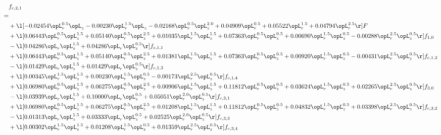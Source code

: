 \begin{alignat}{2} 
\label{eq:f_21_1} 
& f_{c,2,1} \nonumber \\ 
 = \\ 
& + \l[  -0.02454 \opL_r^{0.5} \opL_z   -0.00230 \opL_r^{1.5} \opL_z   -0.02168 \opL_r^{0.5} \opL_z^{2.0} +  0.04909 \opL_r^{0.5} +  0.05522 \opL_r^{1.5} +  0.04794 \opL_r^{2.5}  \r] F \nonumber \\ 
& + \l[  0.06443 \opL_r^{0.5} \opL_z^{1.5} +  0.05140 \opL_r^{0.5} \opL_z^{2.5} +  0.01035 \opL_r^{1.5} \opL_z^{1.5} +  0.07363 \opL_r^{0.5} \opL_z^{0.5} +  0.00690 \opL_r^{1.5} \opL_z^{0.5}   -0.00288 \opL_r^{2.5} \opL_z^{0.5}  \r] f_{1,0} \nonumber \\ 
& - \l[  0.04286 \opL_r \opL_z^{1.5} +  0.04286 \opL_r \opL_z^{0.5}  \r] f_{c,1,1} \nonumber \\ 
& + \l[  0.06443 \opL_r^{0.5} \opL_z^{1.5} +  0.05140 \opL_r^{0.5} \opL_z^{2.5} +  0.01381 \opL_r^{1.5} \opL_z^{1.5} +  0.07363 \opL_r^{0.5} \opL_z^{0.5} +  0.00920 \opL_r^{1.5} \opL_z^{0.5}   -0.00431 \opL_r^{2.5} \opL_z^{0.5}  \r] f_{c,1,2} \nonumber \\ 
& - \l[  0.01429 \opL_r \opL_z^{1.5} +  0.01429 \opL_r \opL_z^{0.5}  \r] f_{c,1,3} \nonumber \\ 
& + \l[  0.00345 \opL_r^{1.5} \opL_z^{1.5} +  0.00230 \opL_r^{1.5} \opL_z^{0.5}   -0.00173 \opL_r^{2.5} \opL_z^{0.5}  \r] f_{c,1,4} \nonumber \\ 
& + \l[  0.06980 \opL_r^{0.5} \opL_z^{1.5} +  0.06275 \opL_r^{0.5} \opL_z^{2.5} +  0.00906 \opL_r^{1.5} \opL_z^{1.5} +  0.11812 \opL_r^{0.5} \opL_z^{0.5} +  0.03624 \opL_r^{1.5} \opL_z^{0.5} +  0.02265 \opL_r^{2.5} \opL_z^{0.5}  \r] f_{3,0} \nonumber \\ 
& - \l[  0.03939 \opL_r \opL_z^{1.5} +  0.10000 \opL_r \opL_z^{0.5} +  0.05051 \opL_r^{2.0} \opL_z^{0.5}  \r] f_{c,3,1} \nonumber \\ 
& + \l[  0.06980 \opL_r^{0.5} \opL_z^{1.5} +  0.06275 \opL_r^{0.5} \opL_z^{2.5} +  0.01208 \opL_r^{1.5} \opL_z^{1.5} +  0.11812 \opL_r^{0.5} \opL_z^{0.5} +  0.04832 \opL_r^{1.5} \opL_z^{0.5} +  0.03398 \opL_r^{2.5} \opL_z^{0.5}  \r] f_{c,3,2} \nonumber \\ 
& - \l[  0.01313 \opL_r \opL_z^{1.5} +  0.03333 \opL_r \opL_z^{0.5} +  0.02525 \opL_r^{2.0} \opL_z^{0.5}  \r] f_{c,3,3} \nonumber \\ 
& + \l[  0.00302 \opL_r^{1.5} \opL_z^{1.5} +  0.01208 \opL_r^{1.5} \opL_z^{0.5} +  0.01359 \opL_r^{2.5} \opL_z^{0.5}  \r] f_{c,3,4} \nonumber \\ 

\end{alignat}
